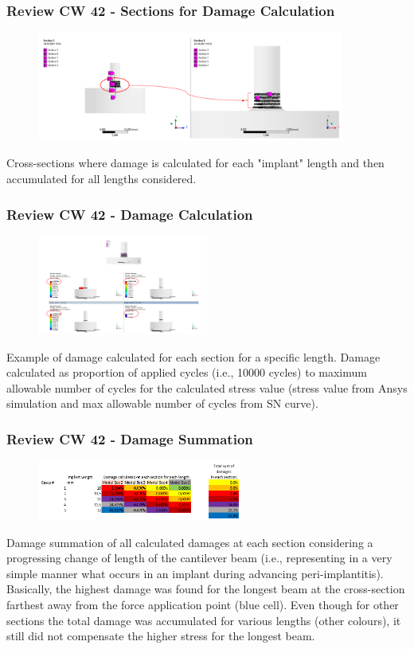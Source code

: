 \begin{frame}
  \frametitle{Review CW 42 - Sections for Damage Calculation}
	\begin{figure}
		\includegraphics[width=0.9\textwidth]{pictures/CW42_6}
	\end{figure}
	\centering Cross-sections where damage is calculated for each "implant" length and then accumulated for all lengths considered.
\end{frame}

\begin{frame}
  \frametitle{Review CW 42 - Damage Calculation}
	\begin{figure}
		\includegraphics[width=0.5\textwidth]{pictures/CW42_7}
	\end{figure}
	Example of damage calculated for each section for a specific length. Damage calculated as proportion of applied cycles (i.e., 10000 cycles) to maximum allowable number of cycles for the calculated stress value (stress value from Ansys simulation and max allowable number of cycles from SN curve).
\end{frame}

\begin{frame}
  \frametitle{Review CW 42 - Damage Summation}
	\begin{figure}
		\includegraphics[width=0.6\textwidth]{pictures/CW42_8}
	\end{figure}
	Damage summation of all calculated damages at each section considering a progressing change of length of the cantilever beam (i.e., representing in a very simple manner what occurs in an implant during advancing peri-implantitis).
	Basically, the highest damage was found for the longest beam at the cross-section farthest away from the force application point (blue cell). Even though for other sections the total damage was accumulated for various lengths (other colours), it still did not compensate the higher stress for the longest beam.
\end{frame}


